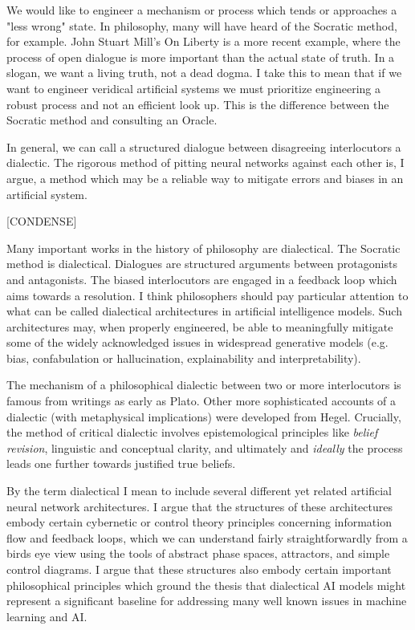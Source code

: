\documentclass[11pt, oneside]{article}   	%
\begin{document}
We would like to engineer a mechanism or process which tends or approaches a "less wrong" state.  In philosophy, many will have heard of the Socratic method, for example.  John Stuart Mill's On Liberty is a more recent example, where the process of open dialogue is more important than the actual state of truth.  In a slogan, we want a living truth, not a dead dogma.  I take this to mean that if we want to engineer veridical artificial systems we must prioritize engineering a robust process and not an efficient look up.  This is the difference between the Socratic method and consulting an Oracle.

In general, we can call a structured dialogue between disagreeing interlocutors a dialectic.  The rigorous method of pitting neural networks against each other is, I argue, a method which may be a reliable way to mitigate errors and biases in an artificial system. 


[CONDENSE]

Many important works in the history of philosophy are dialectical.  The Socratic method is dialectical.  Dialogues are structured arguments between protagonists and antagonists.  The biased interlocutors are engaged in a feedback loop which aims towards a resolution.  I think philosophers should pay particular attention to what can be called dialectical architectures in artificial intelligence models.  Such architectures may, when properly engineered, be able to meaningfully mitigate some of the widely acknowledged issues in widespread generative models (e.g. bias, confabulation or hallucination, explainability and interpretability).



The mechanism of a philosophical dialectic between two or more interlocutors is famous from writings as early as Plato.  Other more sophisticated accounts of a dialectic (with metaphysical implications) were developed from Hegel.  \citep{sep-hegel-dialectics}  Crucially, the method of critical dialectic involves epistemological principles like \emph{belief revision}, linguistic and conceptual clarity, and ultimately and \emph{ideally} the process leads one further towards justified true beliefs. 








By the term dialectical I mean to include several different yet related artificial neural network architectures.  I argue that the structures of these architectures embody certain cybernetic or control theory principles concerning information flow and feedback loops, which we can understand fairly straightforwardly from a birds eye view using the tools of abstract phase spaces, attractors, and simple control diagrams.  I argue that these structures also embody certain important philosophical principles which ground the thesis that dialectical AI models might represent a significant baseline for addressing many well known issues in machine learning and AI.
\end{document}
